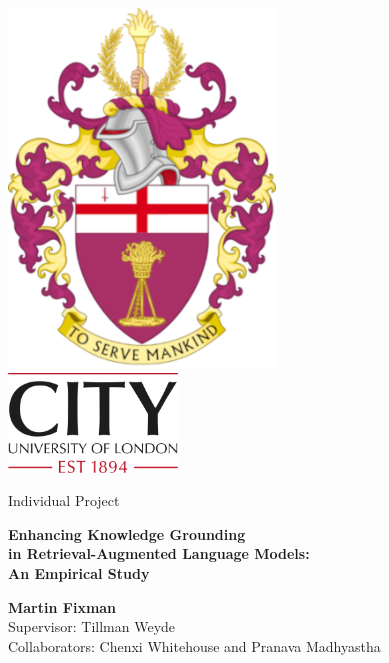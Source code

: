 \documentclass[a4paper,11pt]{article}
\begin{document}
\begin{titlepage}
	\begin{center}
		\LARGE
		\sffamily

		\includegraphics[height=270pt]{to_serve_mankind.png} \\[1ex]
		\includegraphics[height=75pt]{City.png}

		\vspace{30pt}

		Individual Project

		\vspace{15pt}

		\begin{Huge}
			\bfseries
			Enhancing Knowledge Grounding \\ in Retrieval-Augmented Language Models: \\[1em]
			An Empirical Study
		\end{Huge}

		\vfill{}

		\begin{sffamily}
			\textbf{Martin Fixman} \\[1em]
			Supervisor: Tillman Weyde \\
			Collaborators: Chenxi Whitehouse and Pranava Madhyastha
		\end{sffamily}
	\end{center}
\end{titlepage}
\restoregeometry{}
\end{document}
